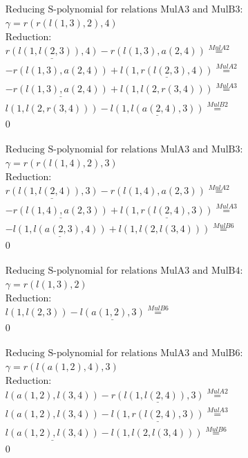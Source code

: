 \documentclass[11pt]{amsart}
\begin{document}
\begin{align*} 
& \text{Reducing S-polynomial for relations MulA3 and MulB3:} \\ 
& \gamma = r(r(l(1,3),2),4) \\ 
& \text{Reduction}: \\&\underline{r(l(1,l(2,3)),4)} - r(l(1,3),a(2,4)) \stackrel{ MulA2 }{=}  \\ 
& - r(l(1,3),a(2,4)) + \underline{l(1,r(l(2,3),4))} \stackrel{ MulA2 }{=}  \\ 
& - \underline{r(l(1,3),a(2,4))} + l(1,l(2,r(3,4))) \stackrel{ MulA3 }{=}  \\ 
&l(1,l(2,r(3,4))) - \underline{l(1,l(a(2,4),3))} \stackrel{ MulB2 }{=}  \\ 
&0\\ 
\end{align*} 
 
\begin{align*} 
& \text{Reducing S-polynomial for relations MulA3 and MulB3:} \\ 
& \gamma = r(r(l(1,4),2),3) \\ 
& \text{Reduction}: \\&\underline{r(l(1,l(2,4)),3)} - r(l(1,4),a(2,3)) \stackrel{ MulA2 }{=}  \\ 
& - \underline{r(l(1,4),a(2,3))} + \underline{l(1,r(l(2,4),3))} \stackrel{ MulA3 }{=}  \\ 
& - \underline{l(1,l(a(2,3),4))} + l(1,l(2,l(3,4))) \stackrel{ MulB6 }{=}  \\ 
&0\\ 
\end{align*} 
 
\begin{align*} 
& \text{Reducing S-polynomial for relations MulA3 and MulB4:} \\ 
& \gamma = r(l(1,3),2) \\ 
& \text{Reduction}: \\&l(1,l(2,3)) - \underline{l(a(1,2),3)} \stackrel{ MulB6 }{=}  \\ 
&0\\ 
\end{align*} 
 
\begin{align*} 
& \text{Reducing S-polynomial for relations MulA3 and MulB6:} \\ 
& \gamma = r(l(a(1,2),4),3) \\ 
& \text{Reduction}: \\&l(a(1,2),l(3,4)) - \underline{r(l(1,l(2,4)),3)} \stackrel{ MulA2 }{=}  \\ 
&l(a(1,2),l(3,4)) - \underline{l(1,r(l(2,4),3))} \stackrel{ MulA3 }{=}  \\ 
&\underline{l(a(1,2),l(3,4))} - l(1,l(2,l(3,4))) \stackrel{ MulB6 }{=}  \\ 
&0\\ 
\end{align*} 
 
\end{document}
